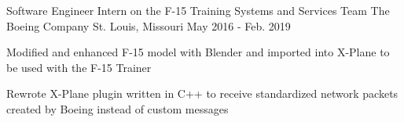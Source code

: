 \begin{cventries}
  \cventry
    {Software Engineer Intern on the F-15 Training Systems and Services Team} %
    {The Boeing Company} %
    {St. Louis, Missouri} %
    {May 2016 - Feb. 2019} %
    {
      \begin{cvitems} %
        \item {Modified and enhanced F-15 model with Blender and imported into X-Plane to be used with the F-15 Trainer}
        \item {Rewrote X-Plane plugin written in C++ to receive standardized network packets created by Boeing instead of custom messages}
      \end{cvitems}
    }

\end{cventries}

